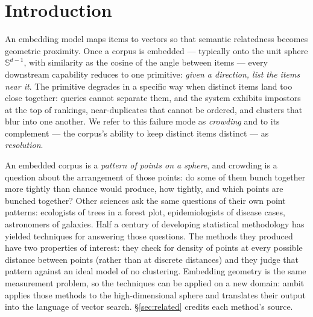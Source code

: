\documentclass[11pt,letterpaper]{article}
\newcommand{\sphere}{\mathbb{S}^{d-1}}
\begin{document}
\begin{abstract}
On a million-document legal corpus, the repairs \textsf{ambit} chose
--- merging the near-duplicate documents it names --- improved retrieval
without harming any query. Added as penalty terms to a supervised
fine-tune, the same measurements halved the damage that fine-tune caused
outside its training data at no cost to its gains, and a label-free rule
built on them selected the better of two fine-tuned models before any
label was read.
\end{abstract}

\clearpage
\setcounter{page}{1}

\section{Introduction}

An embedding model maps items to vectors so that semantic relatedness becomes
geometric proximity. Once a corpus is embedded --- typically onto the unit
sphere $\sphere$, with similarity as the cosine of the angle between items ---
every downstream capability reduces to one primitive: \emph{given a direction,
list the items near it}. The primitive degrades in a specific way when
distinct items land too close together: queries cannot separate them, and the
system exhibits impostors at the top of rankings, near-duplicates that cannot
be ordered, and clusters that blur into one another. We refer to this failure
mode as \emph{crowding} and to its complement --- the corpus's ability to
keep distinct items distinct --- as \emph{resolution}.

An embedded corpus is a \emph{pattern of points on a sphere}, and crowding
is a question about the arrangement of those points: do some of them bunch
together more tightly than chance would produce, how tightly, and which
points are bunched together? Other sciences ask the same questions of
their own point patterns: ecologists of trees in a forest plot,
epidemiologists of disease cases, astronomers of galaxies. Half a century
of developing statistical methodology has yielded techniques for answering
those questions. The methods they produced have two properties of
interest: they check for density of points at every possible distance
between points (rather than at discrete distances) and they judge that
pattern against an ideal model of no clustering. Embedding geometry is the
same measurement problem, so the techniques can be applied on a new
domain: \textsf{ambit} applies those methods to the high-dimensional
sphere and translates their output into the language of vector search.
\S\ref{sec:related} credits each method's source.
\end{document}

